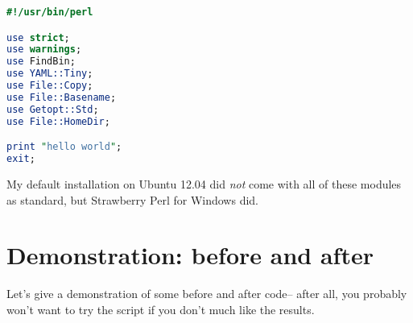  	\begin{lstlisting}[language=Perl,caption={\lstinline!helloworld.pl!}]
#!/usr/bin/perl

use strict;
use warnings;           
use FindBin;            
use YAML::Tiny;         
use File::Copy;         
use File::Basename;     
use Getopt::Std;        
use File::HomeDir;      

print "hello world";
exit;
 	\end{lstlisting}
 	My default installation on Ubuntu 12.04 did \emph{not} come
 	with all of these modules as standard, but Strawberry Perl for Windows \cite{strawberryperl}
 	did.
 	 	 	 	 	
\section{Demonstration: before and after}
 Let's give a demonstration of some before and after code-- after all, you probably
 won't want to try the script if you don't much like the results.
     
